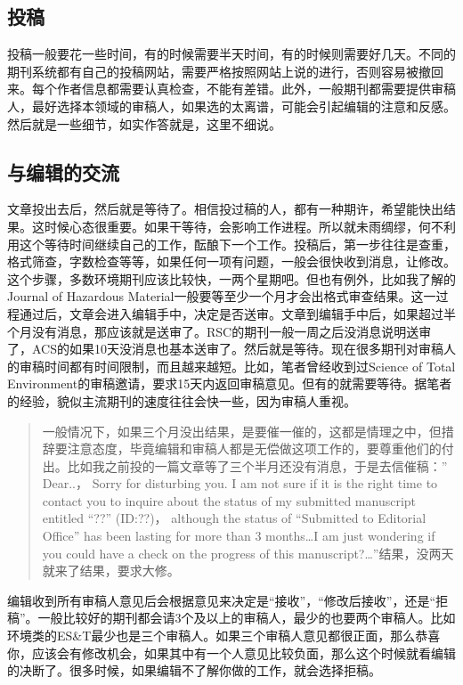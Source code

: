 \documentclass[
]{book}
\begin{document}
\hypertarget{ux6295ux7a3f}{%
\subsection{投稿}\label{ux6295ux7a3f}}

投稿一般要花一些时间，有的时候需要半天时间，有的时候则需要好几天。不同的期刊系统都有自己的投稿网站，需要严格按照网站上说的进行，否则容易被撤回来。每个作者信息都需要认真检查，不能有差错。此外，一般期刊都需要提供审稿人，最好选择本领域的审稿人，如果选的太离谱，可能会引起编辑的注意和反感。然后就是一些细节，如实作答就是，这里不细说。

\hypertarget{ux4e0eux7f16ux8f91ux7684ux4ea4ux6d41}{%
\subsection{与编辑的交流}\label{ux4e0eux7f16ux8f91ux7684ux4ea4ux6d41}}

文章投出去后，然后就是等待了。相信投过稿的人，都有一种期许，希望能快出结果。这时候心态很重要。如果干等待，会影响工作进程。所以就未雨绸缪，何不利用这个等待时间继续自己的工作，酝酿下一个工作。投稿后，第一步往往是查重，格式筛查，字数检查等等，如果任何一项有问题，一般会很快收到消息，让修改。这个步骤，多数环境期刊应该比较快，一两个星期吧。但也有例外，比如我了解的Journal of Hazardous Material一般要等至少一个月才会出格式审查结果。这一过程通过后，文章会进入编辑手中，决定是否送审。文章到编辑手中后，如果超过半个月没有消息，那应该就是送审了。RSC的期刊一般一周之后没消息说明送审了，ACS的如果10天没消息也基本送审了。然后就是等待。现在很多期刊对审稿人的审稿时间都有时间限制，而且越来越短。比如，笔者曾经收到过Science of Total Environment的审稿邀请，要求15天内返回审稿意见。但有的就需要等待。据笔者的经验，貌似主流期刊的速度往往会快一些，因为审稿人重视。

\begin{quote}
一般情况下，如果三个月没出结果，是要催一催的，这都是情理之中，但措辞要注意态度，毕竟编辑和审稿人都是无偿做这项工作的，要尊重他们的付出。比如我之前投的一篇文章等了三个半月还没有消息，于是去信催稿：'' Dear..， Sorry for disturbing you. I am not sure if it is the right time to contact you to inquire about the status of my submitted manuscript entitled ``??'' (ID:??)， although the status of ``Submitted to Editorial Office'' has been lasting for more than 3 months\ldots I am just wondering if you could have a check on the progress of this manuscript?\ldots''结果，没两天就来了结果，要求大修。
\end{quote}

编辑收到所有审稿人意见后会根据意见来决定是``接收''，``修改后接收''，还是``拒稿''。一般比较好的期刊都会请3个及以上的审稿人，最少的也要两个审稿人。比如环境类的ES\&T最少也是三个审稿人。如果三个审稿人意见都很正面，那么恭喜你，应该会有修改机会，如果其中有一个人意见比较负面，那么这个时候就看编辑的决断了。很多时候，如果编辑不了解你做的工作，就会选择拒稿。
\end{document}
